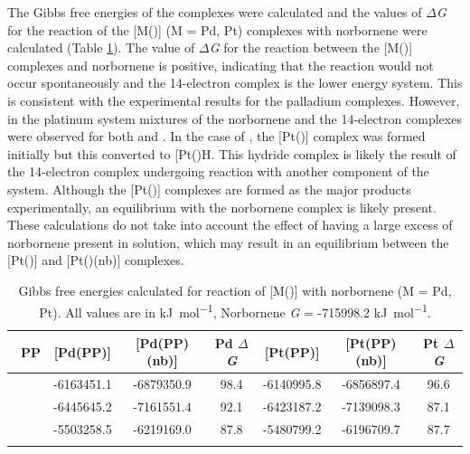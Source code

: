 The Gibbs free energies of the complexes were calculated and the values of $\Delta$\emph{G} for the reaction of the [M(\tBuxantphos)] (M = Pd, Pt) complexes with norbornene  were calculated (Table \ref{DFT:nbenergy}).  The value of $\Delta$\emph{G} for the reaction between the [M(\tBuxantphos)] complexes and norbornene is positive, indicating that the reaction would not occur spontaneously and the 14-electron complex is the lower energy system.  This is consistent with the experimental results for the palladium complexes.  However, in the platinum system mixtures of the norbornene and the 14-electron complexes were observed for both \tBusixantphos{} and \tButhixantphos.  In the case of \tBuxantphos{}, the [Pt(\tBuxantphos)] complex was formed initially but this converted to [Pt(\tBuxantphosk)H\ce{]+}.  This hydride complex is likely the result of the 14-electron complex undergoing reaction with another component of the system.  Although the [Pt(\tBuxantphos)] complexes are formed as the major products experimentally, an equilibrium with the norbornene complex is likely present.  These calculations do not take into account the effect of having a large excess of norbornene present in solution, which may result in an equilibrium between the [Pt(\tBuxantphos)] and [Pt(\tBuxantphos)(nb)] complexes.  

\begin{table}
\caption[Gibbs free energies calculated for the formation of [M(\tBuxantphos)(nb){]}]{Gibbs free energies calculated for reaction of [M(\tBuxantphos)] with norbornene (M = Pd, Pt).  All values are in \si{\kilo\joule\per\mole}, Norbornene \emph{G} = -715998.2 \si{\kilo\joule\per\mole}.}
\vspace{1em}
\label{DFT:nbenergy}
\small
\begin{center}
\begin{tabular}{l c c c c c c}
	\toprule
	~\bfseries{PP} & \bfseries{{[}Pd(PP)]} & \bfseries{{[}Pd(PP)(nb)]} & \bfseries{Pd $\Delta$\emph{G}} & \bfseries{{[}Pt(PP)]} & \bfseries{{[}Pt(PP)(nb)]} & \bfseries{Pt $\Delta$\emph{G}} \\
	\midrule		
	~\tBuSixantphos	& -6163451.1	& -6879350.9 & 98.4 & -6140995.8 & -6856897.4 & 96.6 \\
	~\tBuThixantphos	& -6445645.2	& -7161551.4 & 92.1 & -6423187.2 & -7139098.3 & 87.1 \\
	~\tBuXantphos{}	& -5503258.5	& -6219169.0 & 87.8 & -5480799.2 & -6196709.7 & 87.7 \\
	\bottomrule{}
\end{tabular}
\end{center}
\end{table}

